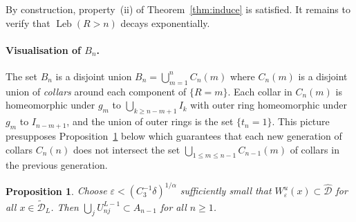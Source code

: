 \documentclass[12pt]{article}
\numberwithin{equation}{section}
\newtheorem{prop}[thm]{Proposition}
\newcommand{\hcD}{{\widehat {\mathcal D}}}
\newcommand{\tcD}{{\widetilde {\mathcal D}}}
\newcommand{\eps}{\varepsilon}
\newcommand{\Leb}{\operatorname{Leb}}
\begin{document}
\begin{rmk} By construction, property~(ii) of Theorem~\ref{thm:induce} is satisfied.
 It remains to verify that
$\Leb(R>n)$ decays exponentially.
\end{rmk}

\paragraph{Visualisation of $B_n$.}
The set $B_n$ is a disjoint union $B_n=\bigcup_{m=1}^n C_n(m)$ where $C_n(m)$ is a disjoint union of \emph{collars} around each component of $\{R= m\}$.
Each collar in $C_n(m)$ is homeomorphic under $g_m$ to $\bigcup_{k\ge n-m+1}I_k$ with outer ring homeomorphic under $g_m$ to $I_{n-m+1}$,
and the union of outer rings is the set $\{t_n=1\}$.
This picture presupposes Proposition~\ref{prop:eps} below which guarantees that each new generation of collars $C_n(n)$ does not intersect the set $\bigcup_{1\le m\le n-1}C_{n-1}(m)$ of collars in the previous generation.

\begin{prop} \label{prop:eps}
Choose $\eps<(C_3^{-1}\delta)^{1/\alpha}$ sufficiently small that $W^u_\eps(x)\subset\hcD$ for all $x\in\tcD_L$. Then
 $\bigcup_jU_{nj}^{L-1}\subset A_{n-1}$ for all $n\ge1$.
\end{prop}
\end{document}
